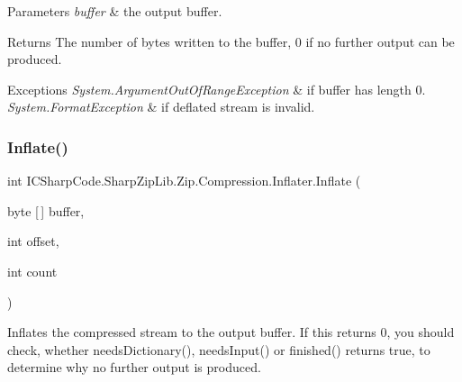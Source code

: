 \begin{DoxyParams}{Parameters}
{\em buffer} & the output buffer. \\
\hline
\end{DoxyParams}
\begin{DoxyReturn}{Returns}
The number of bytes written to the buffer, 0 if no further output can be produced. 
\end{DoxyReturn}

\begin{DoxyExceptions}{Exceptions}
{\em System.\+Argument\+Out\+Of\+Range\+Exception} & if buffer has length 0. \\
\hline
{\em System.\+Format\+Exception} & if deflated stream is invalid. \\
\hline
\end{DoxyExceptions}
\mbox{\label{class_i_c_sharp_code_1_1_sharp_zip_lib_1_1_zip_1_1_compression_1_1_inflater_aa77071f9ea123757cf11bae7b0fc4ea9}} 
\subsubsection{\texorpdfstring{Inflate()}{Inflate()}\hspace{0.1cm}{\footnotesize\ttfamily [2/4]}}
{\footnotesize\ttfamily int I\+C\+Sharp\+Code.\+Sharp\+Zip\+Lib.\+Zip.\+Compression.\+Inflater.\+Inflate (\begin{DoxyParamCaption}\item[{byte \mbox{[}$\,$\mbox{]}}]{buffer,  }\item[{int}]{offset,  }\item[{int}]{count }\end{DoxyParamCaption})\hspace{0.3cm}{\ttfamily [inline]}}



Inflates the compressed stream to the output buffer. If this returns 0, you should check, whether needs\+Dictionary(), needs\+Input() or finished() returns true, to determine why no further output is produced. 



